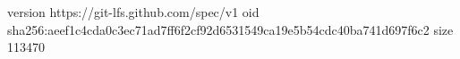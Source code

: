 version https://git-lfs.github.com/spec/v1
oid sha256:aeef1c4cda0c3ec71ad7ff6f2cf92d6531549ca19e5b54cdc40ba741d697f6c2
size 113470
